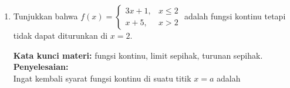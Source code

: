 \documentclass[10pt,openany,a4paper]{article}
\theoremstyle{definition}
\theoremstyle{definition}
\theoremstyle{plain}
\newenvironment{jawab}[2][tes]{%
\par\noindent\textbf{Kata kunci materi:} #1.\\
\textbf{Penyelesaian:} #2%
}{}
\begin{document}
\begin{enumerate}
\begin{jawab}[domain fungsi, fungsi komposisi, operasi fungsi]
{\begin{enumerate}
                    Karena $\sqrt{5-x} = 2$ jika dan hanya jika $5-x = 4$, yang berarti $x = 1$, didapatkan
                    \begin{align*}
                        \colorlet{oldcolor}{.}
        \color{red}
        \setlength{\fboxrule}{1pt} \boxed{\color{oldcolor}D(f\circ g) = (-\infty, 5] \setminus \{1\} = (-\infty, 1) \cup (1, 5]}\color{oldcolor}.
                    \end{align*}
                    Selanjutnya, untuk pembagian fungsi diperoleh
                    \begin{align*}
                        \left(\frac{f}{g}\right)(x) = \frac{f(x)}{g(x)} = \frac{\frac{1}{x-2}}{\sqrt{5-x}} = \colorlet{oldcolor}{.}
        \color{red}
        \setlength{\fboxrule}{1pt} \boxed{\color{oldcolor}\frac{1}{(x-2)\sqrt{5-x}}}\color{oldcolor}
                    \end{align*}
                    Domain dari $\frac{f}{g}$ adalah irisan domain $f$ dan domain $g$, dikurangi nilai $x$ yang membuat $g(x)=0$, yaitu
                    \begin{align*}
                        \colorlet{oldcolor}{.}
        \color{blue}
        \setlength{\fboxrule}{1pt} \boxed{\color{oldcolor}D\left(\frac{f}{g}\right) = \{x \in D(f)\cap D(g) : g(x) \neq 0\}}\color{oldcolor}.
                    \end{align*}
                    Karena $D(f)\cap D(g) = (-\infty,2)\cup(2,5]$ dan $g(x)=\sqrt{5-x}=0$ jika dan hanya jika $x=5$, didapatkan
                    \begin{align*}
                        \colorlet{oldcolor}{.}
        \color{red}
        \setlength{\fboxrule}{1pt} \boxed{\color{oldcolor}D\left(\frac{f}{g}\right) = (-\infty, 2) \cup (2, 5)}\color{oldcolor}.
                    \end{align*}
                \end{enumerate}
            }
            \end{jawab}
            \item Tunjukkan bahwa $f(x)=\begin{cases}
                3x+1, &x\leq 2\\
                x+5, &x>2
            \end{cases}$ adalah fungsi kontinu tetapi tidak dapat diturunkan di $x=2$.
            \begin{jawab}[fungsi kontinu, limit sepihak, turunan sepihak]{~\\
                Ingat kembali syarat fungsi kontinu di suatu titik \(x = a\) adalah
}
\end{jawab}
\end{enumerate}
\end{document}
